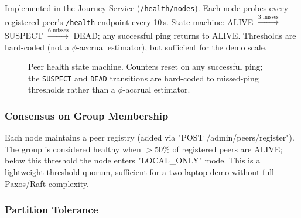 \documentclass[11pt,a4paper]{article}
\begin{document}
Implemented in the Journey Service (\texttt{/health/nodes}). Each node probes every registered peer's \texttt{/health} endpoint every 10\,s. State machine: ALIVE $\xrightarrow{\text{3 misses}}$ SUSPECT $\xrightarrow{\text{6 misses}}$ DEAD; any successful ping returns to ALIVE. Thresholds are hard-coded (not a $\phi$-accrual estimator), but sufficient for the demo scale.

\begin{figure}[H]
\centering
{}
\caption{Peer health state machine. Counters reset on any successful
ping; the \texttt{SUSPECT} and \texttt{DEAD} transitions are hard-coded
to missed-ping thresholds rather than a $\phi$-accrual estimator.}
\label{fig:health-sm}
\end{figure}
 
\subsubsection{Consensus on Group Membership}

Each node maintains a peer registry (added via "POST /admin/peers/register"). The group is considered healthy when $>$50\% of registered peers are ALIVE; below this threshold the node enters "LOCAL\_ONLY" mode. This is a lightweight threshold quorum, sufficient for a two-laptop demo without full Paxos/Raft complexity.

\subsubsection{Partition Tolerance}
\end{document}
